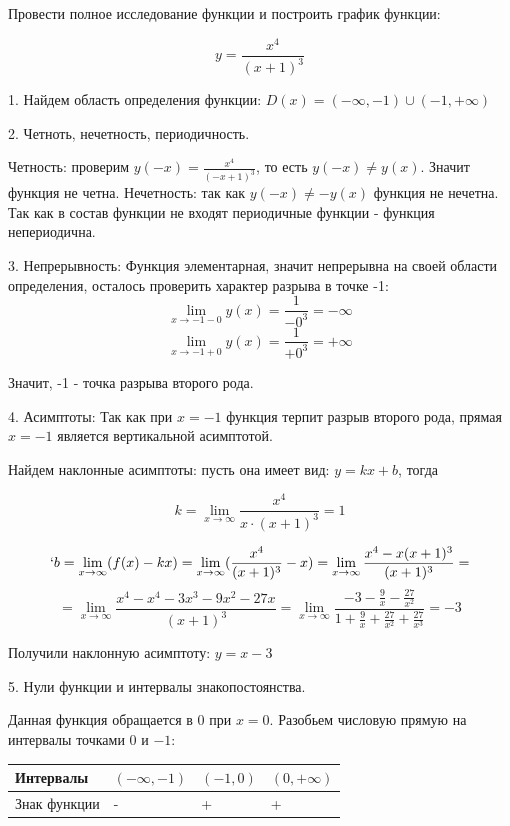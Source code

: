 
Провести полное исследование функции и построить график функции:

\[
    y = \frac{x^4}{(x+1)^3}
\]

1. Найдем область определения функции: $D(x) = (- \infty,-1) \cup (-1, + \infty)$

2. Четноть, нечетность, периодичность.

Четность: проверим $y(-x) = \frac{x^4}{(-x+1)^3}$, то есть $y(-x) \neq y(x)$. Значит функция не четна.
Нечетность: так как $y(-x) \neq -y(x)$ функция не нечетна.
Так как в состав функции не входят периодичные функции - функция непериодична.

3. Непрерывность: 
Функция элементарная, значит непрерывна на своей области определения, осталось проверить характер разрыва в точке -1:
\[
    \lim_{x \rightarrow -1-0}y(x) = \frac{1}{-0^3} = - \infty 
\]
\[
    \lim_{x \rightarrow -1+0}y(x) = \frac{1}{+0^3} = + \infty 
\]

Значит, -1 - точка разрыва второго рода.

4. Асимптоты: 
Так как при $x = -1$ функция терпит разрыв второго рода, прямая $x = -1$ является вертикальной асимптотой.

Найдем наклонные асимптоты: пусть она имеет вид: $y = kx +b$, тогда

\[
    k = \lim_{x \rightarrow \infty}\frac{x^4}{x \cdot (x+1)^3} = 1
\]

\[
`   b = \lim_{x \rightarrow \infty}(f(x) - kx) = \lim_{x \rightarrow \infty}(\frac{x^4}{(x+1)^3} - x) = \lim_{x \rightarrow \infty}\frac{x^4 - x(x+1)^3}{(x+1)^3} = 
\]
\[
    = \lim_{x \rightarrow \infty} \frac{x^4 - x^4 - 3x^3 - 9x^2 - 27x}{(x + 1)^3} = \lim_{x \rightarrow \infty} \frac{- 3 - \frac{9}{x} - \frac{27}{x^2}}{1 + \frac{9}{x} + \frac{27}{x^2}+\frac{27}{x^3}} = -3
\]

Получили наклонную асимптоту: $y = x - 3$

5. Нули функции и интервалы знакопостоянства.

Данная функция обращается в 0 при $x = 0$. Разобьем числовую прямую на интервалы точками $0$ и $-1$:

\begin{table}[h]
\begin{tabular}{|l|l|l|l|}
\hline
Интервалы    & $(-\infty, -1)$ & $(-1,0)$ & $(0,+\infty)$ \\ \hline
Знак функции & -               & +        & +             \\ \hline
\end{tabular}
\end{table}

